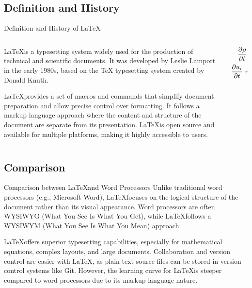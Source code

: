 \documentclass[aspectratio=169]{SUSTechBeamer}
\begin{document}
\subsection{Definition and History}
\begin{frame}{Definition and History of \LaTeX}
    \begin{columns}
        \begin{column}{0.6\textwidth}
  \LaTeX is a typesetting system widely used for the production of technical and scientific documents. It was developed by Leslie Lamport in the early 1980s, based on the TeX typesetting system created by Donald Knuth.

  \LaTeX provides a set of macros and commands that simplify document preparation and allow precise control over formatting. It follows a markup language approach where the content and structure of the document are separate from its presentation. \LaTeX is open source and available for multiple platforms, making it highly accessible to users.
        \end{column}
        \begin{column}{0.4\textwidth}
            \begin{align}
                \frac{\partial \rho}{\partial t}+\rho\frac{\partial u_i}{\partial x_i}&=0\\
                \frac{\partial u_i}{\partial t}+u_j\frac{\partial u_i}{\partial x_j}&=\frac{1}{\rho}\frac{\partial \sigma_{ij}}{\partial x_j}+f_i
            \end{align}
        \end{column}
    \end{columns}
\end{frame}

\subsection{Comparison}
\begin{frame}{Comparison between \LaTeX and Word Processors}
  Unlike traditional word processors (e.g., Microsoft Word), \LaTeX focuses on the logical structure of the document rather than its visual appearance. Word processors are often WYSIWYG (What You See Is What You Get), while \LaTeX follows a WYSIWYM (What You See Is What You Mean) approach.

  \LaTeX offers superior typesetting capabilities, especially for mathematical equations, complex layouts, and large documents. Collaboration and version control are easier with \LaTeX, as plain text source files can be stored in version control systems like Git. However, the learning curve for \LaTeX is steeper compared to word processors due to its markup language nature.
\end{frame}
\end{document}
